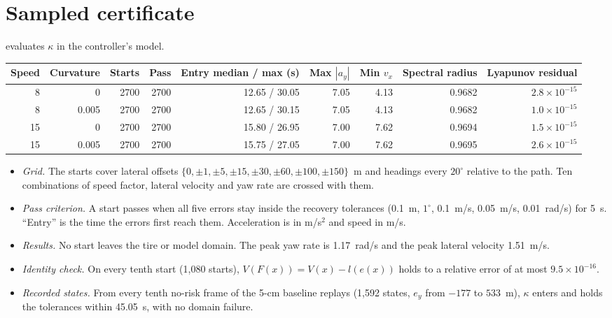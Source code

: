 \documentclass[11pt]{article}
\begin{document}
\section{Sampled certificate}
 evaluates $\kappa$ in the controller's
model.
\begin{center}\footnotesize
\begin{tabular}{rrrrrrrrr}
\toprule
Speed & Curvature & Starts & Pass & Entry median / max (s) & Max $|a_y|$ & Min $v_x$ & Spectral radius & Lyapunov residual\\
\midrule
8 & 0 & 2700 & 2700 & 12.65 / 30.05 & 7.05 & 4.13 & 0.9682 & $2.8\times10^{-15}$\\
8 & 0.005 & 2700 & 2700 & 12.65 / 30.15 & 7.05 & 4.13 & 0.9682 & $1.0\times10^{-15}$\\
15 & 0 & 2700 & 2700 & 15.80 / 26.95 & 7.00 & 7.62 & 0.9694 & $1.5\times10^{-15}$\\
15 & 0.005 & 2700 & 2700 & 15.75 / 27.05 & 7.00 & 7.62 & 0.9695 & $2.6\times10^{-15}$\\
\bottomrule
\end{tabular}\end{center}
\begin{itemize}
\item \emph{Grid.} The starts cover lateral offsets $\{0,\pm1,\pm5,\pm15,\pm30,\pm60,\pm100,\pm150\}$~m and headings
every $20^\circ$ relative to the path. Ten combinations of speed factor, lateral
velocity and yaw rate are crossed with them.
\item \emph{Pass criterion.} A start passes when all five errors stay inside the recovery
tolerances (0.1~m, $1^\circ$, 0.1~m/s, 0.05~m/s, 0.01~rad/s) for 5~s. ``Entry''
is the time the errors first reach them. Acceleration is in m/s$^2$ and speed in m/s.
\item \emph{Results.} No start leaves the tire or model domain. The peak yaw rate is
1.17~rad/s and the peak lateral velocity 1.51~m/s.
\item \emph{Identity check.} On every tenth start (1{,}080 starts),
$V(F(x))=V(x)-l(e(x))$ holds to a relative error of at most
$9.5\times10^{-16}$.
\item \emph{Recorded states.} From every tenth no-risk frame of the 5-cm
baseline replays (1{,}592 states, $e_y$ from $-177$ to $533$~m), $\kappa$
enters and holds the tolerances within 45.05~s, with no domain failure.
\end{itemize}
\end{document}
